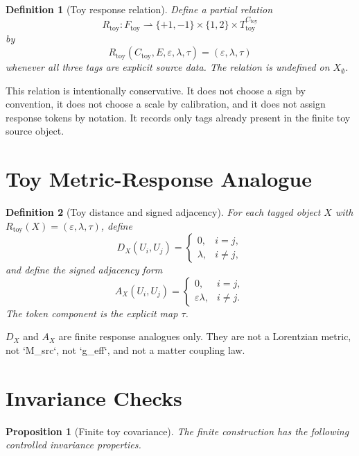\documentclass[11pt]{article}
\newtheorem{definition}{Definition}
\newtheorem{proposition}{Proposition}
\begin{document}
\begin{definition}[Toy response relation]
Define a partial relation
\[
  R_{\mathrm{toy}}:F_{\mathrm{toy}}\rightharpoonup
  \{+1,-1\}\times\{1,2\}\times T_{\mathrm{toy}}^{C_{\mathrm{toy}}}
\]
by
\[
  R_{\mathrm{toy}}(C_{\mathrm{toy}},E,\varepsilon,\lambda,\tau)
  =(\varepsilon,\lambda,\tau)
\]
whenever all three tags are explicit source data. The relation is
undefined on \(X_{\emptyset}\).
\end{definition}

This relation is intentionally conservative. It does not choose a sign
by convention, it does not choose a scale by calibration, and it does
not assign response tokens by notation. It records only tags already
present in the finite toy source object.

\section{Toy Metric-Response Analogue}

\begin{definition}[Toy distance and signed adjacency]
For each tagged object \(X\) with
\(R_{\mathrm{toy}}(X)=(\varepsilon,\lambda,\tau)\), define
\[
  D_X(U_i,U_j)=
  \begin{cases}
    0,& i=j,\\
    \lambda,& i\neq j,
  \end{cases}
\]
and define the signed adjacency form
\[
  A_X(U_i,U_j)=
  \begin{cases}
    0,& i=j,\\
    \varepsilon\lambda,& i\neq j.
  \end{cases}
\]
The token component is the explicit map \(\tau\).
\end{definition}

\(D_X\) and \(A_X\) are finite response analogues only. They are not a
Lorentzian metric, not `M\_src`, not `g\_eff`, and not a matter
coupling law.

\section{Invariance Checks}

\begin{proposition}[Finite toy covariance]
The finite construction has the following controlled invariance
properties.
\end{proposition}
\end{document}
